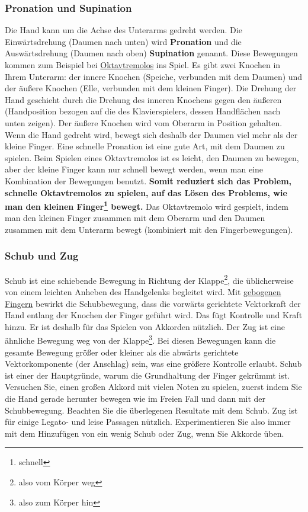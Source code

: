 \subsubsection{Pronation und Supination}\hypertarget{c1iii4ProSup}{}

Die Hand kann um die Achse des Unterarms gedreht werden.
Die Einwärtsdrehung (Daumen nach unten) wird \textbf{Pronation} und die Auswärtsdrehung (Daumen nach oben) \textbf{Supination} genannt.
Diese Bewegungen kommen zum  Beispiel bei \hyperlink{c1iii3b}{Oktavtremolos} ins Spiel.
Es gibt zwei Knochen in Ihrem Unterarm: der innere Knochen (Speiche, verbunden mit dem Daumen) und der äußere Knochen (Elle, verbunden mit dem kleinen Finger).
Die Drehung der Hand geschieht durch die Drehung des inneren Knochens gegen den äußeren (Handposition bezogen auf die des Klavierspielers, dessen Handflächen nach unten zeigen).
Der äußere Knochen wird vom Oberarm in Position gehalten.
Wenn die Hand gedreht wird, bewegt sich deshalb der Daumen viel mehr als der kleine Finger.
Eine schnelle Pronation ist eine gute Art, mit dem Daumen zu spielen.
Beim Spielen eines Oktavtremolos ist es leicht, den Daumen zu bewegen, aber der kleine Finger kann nur schnell bewegt werden, wenn man eine Kombination der Bewegungen benutzt.
\textbf{Somit reduziert sich das Problem, schnelle Oktavtremolos zu spielen, auf das Lösen des Problems, wie man den kleinen Finger\footnote{schnell} bewegt.}
Das Oktavtremolo wird gespielt, indem man den kleinen Finger zusammen mit dem Oberarm und den Daumen zusammen mit dem Unterarm bewegt (kombiniert mit den Fingerbewegungen).
 

\subsubsection{Schub und Zug}\hypertarget{c1iii4SchubZug}{}

Schub ist eine schiebende Bewegung in Richtung der Klappe\footnote{also vom Körper weg}, die üblicherweise von einem leichten Anheben des Handgelenks begleitet wird.
Mit \hyperlink{c1ii2}{gebogenen Fingern} bewirkt die Schubbewegung, dass die vorwärts gerichtete Vektorkraft der Hand entlang der Knochen der Finger geführt wird.
Das fügt Kontrolle und Kraft hinzu.
Er ist deshalb für das Spielen von Akkorden nützlich.
Der Zug ist eine ähnliche Bewegung weg von der Klappe\footnote{also zum Körper hin}.
Bei diesen Bewegungen kann die gesamte Bewegung größer oder kleiner als die abwärts gerichtete Vektorkomponente (der Anschlag) sein, was eine größere Kontrolle erlaubt.
Schub ist einer der Hauptgründe, warum die Grundhaltung der Finger gekrümmt ist.
Versuchen Sie, einen großen Akkord mit vielen Noten zu spielen, zuerst indem Sie die Hand gerade herunter bewegen wie im Freien Fall und dann mit der Schubbewegung.
Beachten Sie die überlegenen Resultate mit dem Schub.
Zug ist für einige Legato- und leise Passagen nützlich.
Experimentieren Sie also immer mit dem Hinzufügen von ein wenig Schub oder Zug, wenn Sie Akkorde üben.


